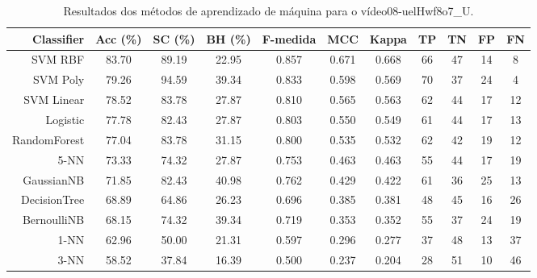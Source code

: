 \begin{table}[!htb]
\centering
\caption{Resultados dos métodos de aprendizado de máquina para o vídeo08-uelHwf8o7_U.}
\label{tab:08-uelHwf8o7_U}
\begin{tabular}{r|c|c|c|c|c|c|c|c|c|c}
\hline\hline
Classifier & Acc (\%) & SC (\%) & BH (\%) & F-medida & MCC & Kappa & TP & TN & FP & FN \\ \hline
SVM RBF & 83.70 & 89.19 & 22.95 & 0.857 & 0.671 & 0.668 & 66 & 47 & 14 & 8 \\ 
SVM Poly & 79.26 & 94.59 & 39.34 & 0.833 & 0.598 & 0.569 & 70 & 37 & 24 & 4 \\ 
SVM Linear & 78.52 & 83.78 & 27.87 & 0.810 & 0.565 & 0.563 & 62 & 44 & 17 & 12 \\ 
Logistic & 77.78 & 82.43 & 27.87 & 0.803 & 0.550 & 0.549 & 61 & 44 & 17 & 13 \\ 
RandomForest & 77.04 & 83.78 & 31.15 & 0.800 & 0.535 & 0.532 & 62 & 42 & 19 & 12 \\ 
5-NN & 73.33 & 74.32 & 27.87 & 0.753 & 0.463 & 0.463 & 55 & 44 & 17 & 19 \\ 
GaussianNB & 71.85 & 82.43 & 40.98 & 0.762 & 0.429 & 0.422 & 61 & 36 & 25 & 13 \\ 
DecisionTree & 68.89 & 64.86 & 26.23 & 0.696 & 0.385 & 0.381 & 48 & 45 & 16 & 26 \\ 
BernoulliNB & 68.15 & 74.32 & 39.34 & 0.719 & 0.353 & 0.352 & 55 & 37 & 24 & 19 \\ 
1-NN & 62.96 & 50.00 & 21.31 & 0.597 & 0.296 & 0.277 & 37 & 48 & 13 & 37 \\ 
3-NN & 58.52 & 37.84 & 16.39 & 0.500 & 0.237 & 0.204 & 28 & 51 & 10 & 46 \\ 
\hline\hline
\end{tabular}
\end{table}
